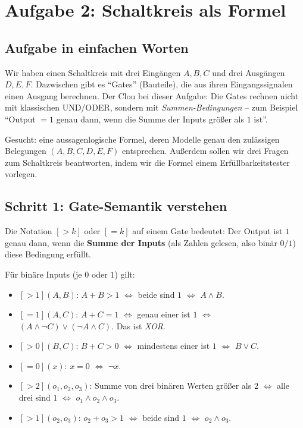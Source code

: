 \documentclass[a4paper,12pt]{article}
\begin{document}
\newpage


\section{Aufgabe 2: Schaltkreis als Formel}

\subsection*{Aufgabe in einfachen Worten}

Wir haben einen Schaltkreis mit drei Eing\"angen $A, B, C$ und drei
Ausg\"angen $D, E, F$. Dazwischen gibt es "`Gates"' (Bauteile), die
aus ihren Eingangssignalen einen Ausgang berechnen. Der Clou bei
dieser Aufgabe: Die Gates rechnen nicht mit klassischen UND/ODER,
sondern mit \emph{Summen-Bedingungen} -- zum Beispiel "`Output $= 1$
genau dann, wenn die Summe der Inputs gr\"o{\ss}er als $1$ ist"'.

Gesucht: eine aussagenlogische Formel, deren Modelle genau den
zul\"assigen Belegungen $(A, B, C, D, E, F)$ entsprechen. Au{\ss}erdem
sollen wir drei Fragen zum Schaltkreis beantworten, indem wir die
Formel einem Erf\"ullbarkeitstester vorlegen.

\subsection*{Schritt 1: Gate-Semantik verstehen}

Die Notation $[> k]$ oder $[= k]$ auf einem Gate bedeutet: Der Output
ist $1$ genau dann, wenn die \textbf{Summe der Inputs}
(als Zahlen gelesen, also bin\"ar $0/1$) diese Bedingung erf\"ullt.

\begin{merkbox}[title={Summen-Bedingungen als Bool'sche Ausdr\"ucke}]
F\"ur bin\"are Inputs (je $0$ oder $1$) gilt:
\begin{itemize}[nosep]
\item $[>1](A, B)$: $A + B > 1$ $\Leftrightarrow$ beide sind $1$
      $\Leftrightarrow$ $A \wedge B$.
\item $[=1](A, C)$: $A + C = 1$ $\Leftrightarrow$ genau einer ist $1$
      $\Leftrightarrow$ $(A \wedge \neg C) \vee (\neg A \wedge C)$.
      Das ist \emph{XOR}.
\item $[>0](B, C)$: $B + C > 0$ $\Leftrightarrow$ mindestens einer ist
      $1$ $\Leftrightarrow$ $B \vee C$.
\item $[=0](x)$: $x = 0$ $\Leftrightarrow$ $\neg x$.
\item $[>2](o_1, o_2, o_3)$: Summe von drei bin\"aren Werten gr\"o{\ss}er
      als $2$ $\Leftrightarrow$ alle drei sind $1$ $\Leftrightarrow$
      $o_1 \wedge o_2 \wedge o_3$.
\item $[>1](o_2, o_3)$: $o_2 + o_3 > 1$ $\Leftrightarrow$ beide sind
      $1$ $\Leftrightarrow$ $o_2 \wedge o_3$.
\end{itemize}
\end{merkbox}
\end{document}
